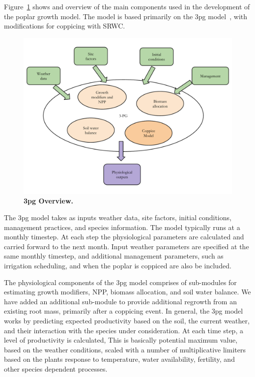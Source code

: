 \documentclass[10pt]{article}
\begin{document}
Figure~\ref{fig:growth-model} shows and overview of the main
components used in the development of the poplar growth model. The
model is based primarily on the \ac{3pg} model~\cite{Landsberg1997,
  landsberg2010physiological}, with modifications for coppicing with
\ac{SRWC}.

\begin{figure}[!ht]
\includegraphics[width=\linewidth]{model_overview}
\caption{ \textbf{\ac{3pg} Overview.}}
\label{fig:growth-model}
\end{figure}

The \ac{3pg} model takes as inputs weather data, site factors, initial
conditions, management practices, and species information.  The model
typically runs at a monthly timestep. At each step the physiological
parameters are calculated and carried forward to the next month. Input
weather parameters are specified at the same monthly timestep, and
additional management parameters, such as irrigation scheduling, and
when the poplar is coppiced are also be included.

The physiological components of the \ac{3pg} model comprises of
sub-modules for estimating growth modifiers, \ac{NPP}, biomass
allocation, and soil water balance.  We have added an additional
sub-module to provide additional regrowth from an existing root mass,
primarily after a coppicing event.  In general, the \ac{3pg} model
works by predicting expected productivity based on the soil, the
current weather, and their interaction with the species under
consideration.  At each time step, a level of productivity is
calculated, This is basically potential maximum value, based on the
weather conditions, scaled with a number of multiplicative limiters
based on the plants response to temperature, water availability,
fertility, and other species dependent processes.
\end{document}
